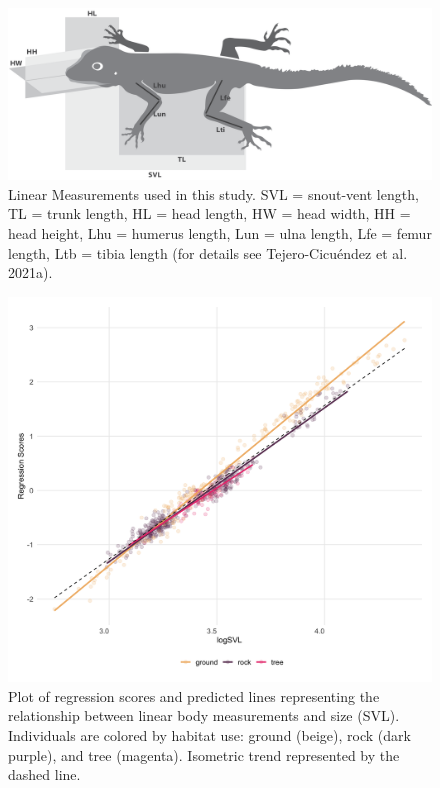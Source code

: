 \documentclass[
  11pt,
]{article}
\begin{document}
\begin{figure}

{\centering \includegraphics[width=1\linewidth]{Figs/Fig1} 

}

\caption{Linear Measurements used in this study. SVL = snout-vent length, TL = trunk length, HL = head length, HW = head width, HH = head height, Lhu = humerus length, Lun = ulna length, Lfe = femur length, Ltb = tibia length (for details see Tejero-Cicu{\'{e}}ndez et al. 2021a).}\label{fig:unnamed-chunk-4}
\end{figure}

\newpage

\begin{figure}

{\centering \includegraphics[width=1\linewidth]{Figs/figure_2_ggplot} 

}

\caption{Plot of regression scores and predicted lines representing the relationship between linear body measurements and size (SVL). Individuals are colored by habitat use: ground (beige), rock (dark purple), and tree (magenta). Isometric trend represented by the dashed line.}\label{fig:unnamed-chunk-5}
\end{figure}
\end{document}
